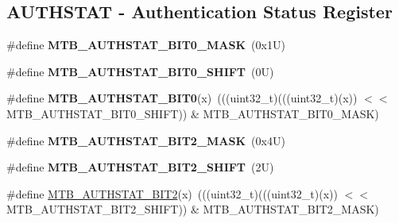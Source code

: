 \subsection*{A\+U\+T\+H\+S\+T\+AT -\/ Authentication Status Register}
\begin{DoxyCompactItemize}
\item 
\mbox{\label{group___m_t_b___register___masks_gaa148665a7a3f112c47167991fefb5dbd}} 
\#define {\bfseries M\+T\+B\+\_\+\+A\+U\+T\+H\+S\+T\+A\+T\+\_\+\+B\+I\+T0\+\_\+\+M\+A\+SK}~(0x1\+U)
\item 
\mbox{\label{group___m_t_b___register___masks_ga0713a5495d348d4a4babb6bd55ad4827}} 
\#define {\bfseries M\+T\+B\+\_\+\+A\+U\+T\+H\+S\+T\+A\+T\+\_\+\+B\+I\+T0\+\_\+\+S\+H\+I\+FT}~(0\+U)
\item 
\mbox{\label{group___m_t_b___register___masks_ga6e35b6cc3212725f148b8117830a3789}} 
\#define {\bfseries M\+T\+B\+\_\+\+A\+U\+T\+H\+S\+T\+A\+T\+\_\+\+B\+I\+T0}(x)~(((uint32\+\_\+t)(((uint32\+\_\+t)(x)) $<$$<$ M\+T\+B\+\_\+\+A\+U\+T\+H\+S\+T\+A\+T\+\_\+\+B\+I\+T0\+\_\+\+S\+H\+I\+FT)) \& M\+T\+B\+\_\+\+A\+U\+T\+H\+S\+T\+A\+T\+\_\+\+B\+I\+T0\+\_\+\+M\+A\+SK)
\item 
\mbox{\label{group___m_t_b___register___masks_ga3821a5eaa059a41c5dd9d851ae1e5462}} 
\#define {\bfseries M\+T\+B\+\_\+\+A\+U\+T\+H\+S\+T\+A\+T\+\_\+\+B\+I\+T2\+\_\+\+M\+A\+SK}~(0x4\+U)
\item 
\mbox{\label{group___m_t_b___register___masks_gac75ef6d5ed3246bd912387fc3e43c2f5}} 
\#define {\bfseries M\+T\+B\+\_\+\+A\+U\+T\+H\+S\+T\+A\+T\+\_\+\+B\+I\+T2\+\_\+\+S\+H\+I\+FT}~(2\+U)
\item 
\#define \mbox{\hyperlink{group___m_t_b___register___masks_ga6765a100839addeb736dfd25c352b204}{M\+T\+B\+\_\+\+A\+U\+T\+H\+S\+T\+A\+T\+\_\+\+B\+I\+T2}}(x)~(((uint32\+\_\+t)(((uint32\+\_\+t)(x)) $<$$<$ M\+T\+B\+\_\+\+A\+U\+T\+H\+S\+T\+A\+T\+\_\+\+B\+I\+T2\+\_\+\+S\+H\+I\+FT)) \& M\+T\+B\+\_\+\+A\+U\+T\+H\+S\+T\+A\+T\+\_\+\+B\+I\+T2\+\_\+\+M\+A\+SK)
\end{DoxyCompactItemize}
